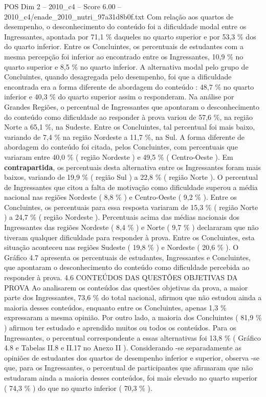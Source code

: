 \begin{textsample}{POS Dim 2 – 2010\_c4 – Score 6.00 – 2010\_c4/enade\_2010\_nutri\_97a31d8b0f.txt}
Com relação aos quartos de desempenho, o desconhecimento do conteúdo foi a dificuldade modal entre os Ingressantes, apontada por 71,1 \% daqueles no quarto superior e por 53,3 \% dos do quarto inferior.
Entre os Concluintes, os percentuais de estudantes com a mesma percepção foi inferior ao encontrado entre os Ingressantes, 10,9 \% no quarto superior e 8,5 \% no quarto inferior.
A alternativa modal pelo grupo de Concluintes, quando desagregada pelo desempenho, foi que a dificuldade encontrada era a forma diferente de abordagem do conteúdo : 48,7 \% no quarto inferior e 40,3 \% do quarto superior assim o responderam.
Na análise por Grandes Regiões, o percentual de Ingressantes que apontaram o desconhecimento do conteúdo como dificuldade ao responder à prova variou de 57,6 \%, na região Norte a 65,1 \%, na Sudeste.
Entre os Concluintes, tal percentual foi mais baixo, variando de 7,4 \% na região Nordeste a 11,7 \%, na Sul.
A forma diferente de abordagem do conteúdo foi citada, pelos Concluintes, com percentuais que variaram entre 40,0 \% ( região Nordeste ) e 49,5 \% ( Centro-Oeste ).
Em \textbf{contrapartida}, os percentuais desta alternativa entre os Ingressantes foram mais baixos, variando de 19,9 \% ( região Sul ) a 22,8 \% ( região Norte ).
O percentual de Ingressantes que citou a falta de motivação como dificuldade superou a média nacional nas regiões Nordeste ( 8,8 \% ) e Centro-Oeste ( 9,2 \% ).
Entre os Concluintes, os percentuais para essa resposta variaram de 15,3 \% ( região Norte ) a 24,7 \% ( região Nordeste ).
Percentuais acima das médias nacionais dos Ingressantes das regiões Nordeste ( 8,4 \% ) e Norte ( 9,7 \% ) declararam que não tiveram qualquer dificuldade para responder à prova.
Entre os Concluintes, esta situação aconteceu nas regiões Sudeste ( 19,8 \% ) e Nordeste ( 20,6 \% ).
O Gráfico 4.7 apresenta os percentuais de estudantes, Ingressantes e Concluintes, que apontaram o desconhecimento do conteúdo como dificuldade percebida ao responder à prova. 4.6 CONTEÚDOS DAS QUESTÕES OBJETIVAS DA PROVA Ao analisarem os conteúdos das questões objetivas da prova, a maior parte dos Ingressantes, 73,6 \% do total nacional, afirmou que não estudou ainda a maioria desses conteúdos, enquanto entre os Concluintes, apenas 1,3 \% expressaram a mesma opinião.
Por outro lado, a maioria dos Concluintes ( 81,9 \% ) afirmou ter estudado e aprendido muitos ou todos os conteúdos.
Para os Ingressantes, o percentual correspondente a essas alternativas foi 13,8 \% ( Gráfico 4.8 e Tabelas II.8 e II.17 no Anexo II ).
Considerando -se separadamente as opiniões de estudantes dos quartos de desempenho inferior e superior, observa -se que, para os Ingressantes, o percentual de participantes que afirmaram que não estudaram ainda a maioria desses conteúdos, foi mais elevado no quarto superior ( 74,3 \% ) do que no quarto inferior ( 70,3 \% ).

\end{textsample}

